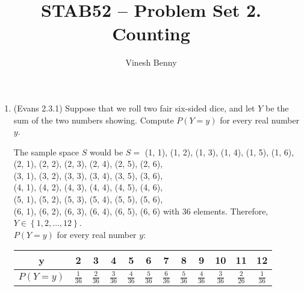 \documentclass[11pt]{article}
\title{STAB52 -- Problem Set 2. Counting}
\author{Vinesh Benny}
\begin{document}
\begin{enumerate}
	\item (Evans 2.3.1) Suppose that we roll two fair six-sided dice, and let $ Y $ be the sum of the two numbers showing. Compute $ P(Y = y) $ for every real number $ y $.
		\begin{mdframed}
			The sample space $ S $  would be $ S = $ \textbraceleft (1, 1), (1, 2), (1, 3), (1, 4), (1, 5), (1, 6),\\
			(2, 1), (2, 2), (2, 3), (2, 4), (2, 5), (2, 6),\\
			(3, 1), (3, 2), (3, 3), (3, 4), (3, 5), (3, 6),  \\
			(4, 1), (4, 2), (4, 3), (4, 4), (4, 5), (4, 6),  \\
			(5, 1), (5, 2), (5, 3), (5, 4), (5, 5), (5, 6),  \\
			(6, 1), (6, 2), (6, 3), (6, 4), (6, 5), (6, 6) \textbraceright with 36 elements. Therefore, $ Y \in \left\lbrace 1, 2, \ldots, 12 \right\rbrace $.\\
			$ P(Y = y) $ for every real number $ y $:\\[-20pt]
			\begin{center}
				\begin{tabular}{*{12}{| c }|}
					\hline
					y            & 2                & 3                & 4                & 5                & 6                & 7                & 8                & 9                & 10               & 11               & 12               \\ \hline
					$ P(Y = y) $ & $ \frac{1}{36} $ & $ \frac{2}{36} $ & $ \frac{3}{36} $ & $ \frac{4}{36} $ & $ \frac{5}{36} $ & $ \frac{6}{36} $ & $ \frac{5}{36} $ & $ \frac{4}{36} $ & $ \frac{3}{36} $ & $ \frac{2}{26} $ & $ \frac{1}{36} $ \\ \hline
				\end{tabular}
			\end{center}
		\end{mdframed}


\end{enumerate}
\end{document}
